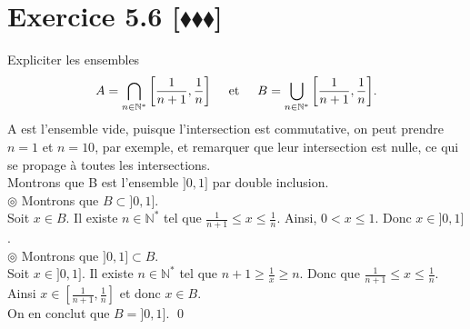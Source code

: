 \documentclass[10pt]{article}
\begin{document}
\section*{Exercice 5.6 [$\blacklozenge\blacklozenge\blacklozenge$]}
\begin{tcolorbox}[enhanced, width=7in, center, size=fbox, fontupper=\large, drop shadow southwest]
    Expliciter les ensembles
    \begin{equation*}
        A = \bigcap_{n\in\mathbb{N}^*}{\left\lbrack{\frac{1}{n+1},\frac{1}{n}}\right\rbrack} \hspace{0.5cm} \text{et} \hspace{0.5cm} B =\bigcup_{n\in\mathbb{N}^*}{\left\lbrack{\frac{1}{n+1}, \frac{1}{n}}\right\rbrack}.
    \end{equation*}
    A est l'ensemble vide, puisque l'intersection est commutative, on peut prendre $n=1$ et $n=10$, par exemple, et remarquer que leur intersection est nulle, ce qui se propage à toutes les intersections.\\[0.25cm]
    Montrons que B est l'ensemble $\rbrack0,1\rbrack$ par double inclusion.\\
    $\circledcirc$ Montrons que $B \subset \rbrack0,1\rbrack$.\\
    Soit $x \in B$. Il existe $n\in\mathbb{N}^*$ tel que $\frac{1}{n+1}\leq x \leq \frac{1}{n}$. Ainsi, $0 < x \leq 1$. Donc $x\in\rbrack0,1\rbrack$.\\
    $\circledcirc$ Montrons que $\rbrack0,1\rbrack \subset B$.\\
    Soit $x \in \rbrack 0,1 \rbrack$. Il existe $n\in\mathbb{N}^*$ tel que $n+1 \geq \frac{1}{x} \geq n$. Donc que $\frac{1}{n+1} \leq x \leq \frac{1}{n}$.\\
    Ainsi $x \in \left\lbrack\frac{1}{n+1},\frac{1}{n}\right\rbrack$ et donc $x \in B$.\\
    On en conclut que $B=\rbrack0,1\rbrack$. \qed
\end{tcolorbox}

\end{document}
